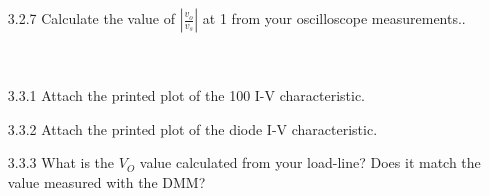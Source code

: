 \documentclass{article}
\begin{document}
\begin{enumerate}
  \item[3.2.7] Calculate the value of $|\frac{v_{o}}{v_{s}}|$ at \unit{1}{\kilo\hertz} from your oscilloscope measurements..
    ~\\~\\~\\
  \item[3.3.1] Attach the printed plot of the \unit{100}{\ohm} I-V characteristic.
  \item[3.3.2] Attach the printed plot of the diode I-V characteristic.
  \item[3.3.3] What is the $V_O$ value calculated from your load-line? Does it match the value measured with the DMM?
    ~\\~\\~\\~\\~\\

\end{enumerate}
\end{document}
